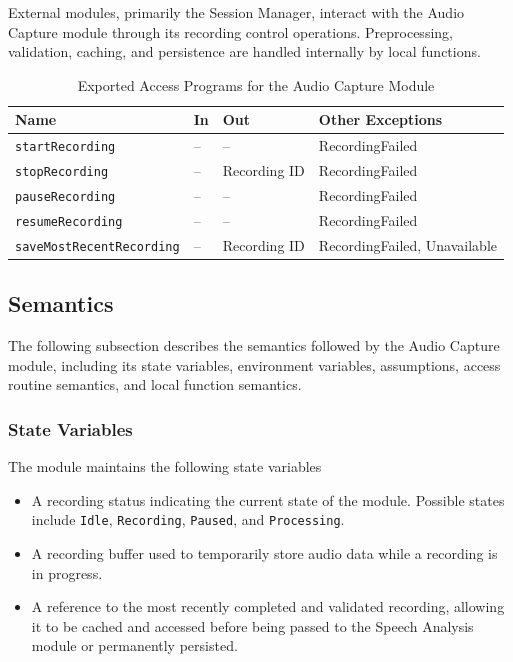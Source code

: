 \documentclass[12pt, titlepage]{article}
\begin{document}
External modules, primarily the Session Manager, interact with the Audio Capture module through its recording control operations. Preprocessing, validation, caching, and persistence are handled internally by local functions.

\begin{table}[H]
\centering
\caption{Exported Access Programs for the Audio Capture Module}
\label{tab:audio-capture}

\small
\begin{tabularx}{\textwidth}{
    @{}
    >{\raggedright\arraybackslash}p{}
    >{\raggedright\arraybackslash}p{}
    >{\raggedright\arraybackslash}p{}
    >{\raggedright\arraybackslash}X
    @{}
}
\toprule
\textbf{Name} & \textbf{In} & \textbf{Out} & \textbf{Other Exceptions}\\
\midrule
\texttt{startRecording} & -- & -- & RecordingFailed\\
\texttt{stopRecording} & -- & Recording ID & RecordingFailed\\
\texttt{pauseRecording} & -- & -- & RecordingFailed\\
\texttt{resumeRecording} & -- & -- & RecordingFailed\\
\texttt{saveMostRecentRecording} & -- & Recording ID & RecordingFailed, Unavailable\\
\bottomrule
\end{tabularx}
\normalsize
\end{table}

\subsection{Semantics}

The following subsection describes the semantics followed by the Audio Capture module, including its state variables, environment variables, assumptions, access routine semantics, and local function semantics.

\subsubsection{State Variables}

The module maintains the following state variables


\begin{itemize}
    \item A recording status indicating the current state of the module. Possible states include \texttt{Idle}, \texttt{Recording}, \texttt{Paused}, and \texttt{Processing}.
    \item A recording buffer used to temporarily store audio data while a recording is in progress.
    \item A reference to the most recently completed and validated recording, allowing it to be cached and accessed before being passed to the Speech Analysis module or permanently persisted.
\end{itemize}
\end{document}
